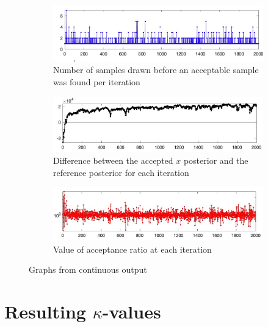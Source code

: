 \begin{figure}
	\centering
	
	\begin{subfigure}[b]{\textwidth}
	\centering	
	\includegraphics[width = \textwidth]{figures/figure10a.jpg}
	\caption{Number of samples drawn before an acceptable sample was found per iteration}
	\label{fig:10a}
	\end{subfigure}{}
	
	\begin{subfigure}[b]{\textwidth}
	\centering	
	\includegraphics[width = \textwidth]{figures/figure10b.jpg}
	\caption{Difference between the accepted $x$ posterior and the reference posterior for each iteration}
	\label{fig:10b}
	\end{subfigure}{}
	
	\begin{subfigure}[b]{\textwidth}
	\centering	
	\includegraphics[width = \textwidth]{figures/figure10c.jpg}
	\caption{Value of acceptance ratio at each iteration}
	\label{fig:10c}
	\end{subfigure}{}
	
	\caption{Graphs from continuous output}
	\label{fig:10}
\end{figure}



\section{Resulting \texorpdfstring{$\kappa$}{TEXT}-values}

